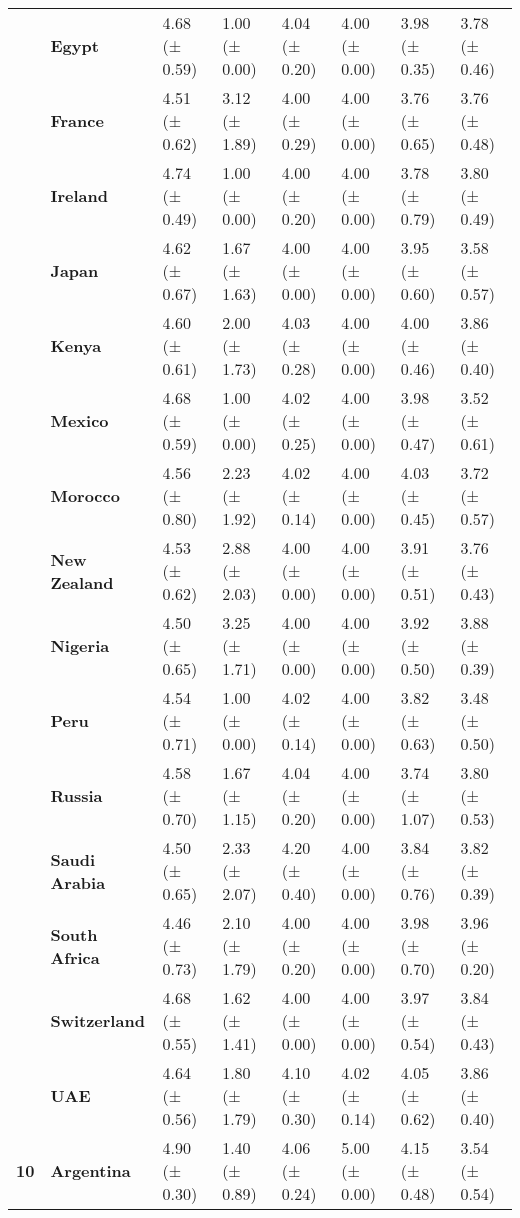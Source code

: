 \begin{longtable}{llllllll}
\textbf{} & \textbf{Egypt} & 4.68 (± 0.59) & 1.00 (± 0.00) & 4.04 (± 0.20) & 4.00 (± 0.00) & 3.98 (± 0.35) & 3.78 (± 0.46) \\
\textbf{} & \textbf{France} & 4.51 (± 0.62) & 3.12 (± 1.89) & 4.00 (± 0.29) & 4.00 (± 0.00) & 3.76 (± 0.65) & 3.76 (± 0.48) \\
\textbf{} & \textbf{Ireland} & 4.74 (± 0.49) & 1.00 (± 0.00) & 4.00 (± 0.20) & 4.00 (± 0.00) & 3.78 (± 0.79) & 3.80 (± 0.49) \\
\textbf{} & \textbf{Japan} & 4.62 (± 0.67) & 1.67 (± 1.63) & 4.00 (± 0.00) & 4.00 (± 0.00) & 3.95 (± 0.60) & 3.58 (± 0.57) \\
\textbf{} & \textbf{Kenya} & 4.60 (± 0.61) & 2.00 (± 1.73) & 4.03 (± 0.28) & 4.00 (± 0.00) & 4.00 (± 0.46) & 3.86 (± 0.40) \\
\textbf{} & \textbf{Mexico} & 4.68 (± 0.59) & 1.00 (± 0.00) & 4.02 (± 0.25) & 4.00 (± 0.00) & 3.98 (± 0.47) & 3.52 (± 0.61) \\
\textbf{} & \textbf{Morocco} & 4.56 (± 0.80) & 2.23 (± 1.92) & 4.02 (± 0.14) & 4.00 (± 0.00) & 4.03 (± 0.45) & 3.72 (± 0.57) \\
\textbf{} & \textbf{New Zealand} & 4.53 (± 0.62) & 2.88 (± 2.03) & 4.00 (± 0.00) & 4.00 (± 0.00) & 3.91 (± 0.51) & 3.76 (± 0.43) \\
\textbf{} & \textbf{Nigeria} & 4.50 (± 0.65) & 3.25 (± 1.71) & 4.00 (± 0.00) & 4.00 (± 0.00) & 3.92 (± 0.50) & 3.88 (± 0.39) \\
\textbf{} & \textbf{Peru} & 4.54 (± 0.71) & 1.00 (± 0.00) & 4.02 (± 0.14) & 4.00 (± 0.00) & 3.82 (± 0.63) & 3.48 (± 0.50) \\
\textbf{} & \textbf{Russia} & 4.58 (± 0.70) & 1.67 (± 1.15) & 4.04 (± 0.20) & 4.00 (± 0.00) & 3.74 (± 1.07) & 3.80 (± 0.53) \\
\textbf{} & \textbf{Saudi Arabia} & 4.50 (± 0.65) & 2.33 (± 2.07) & 4.20 (± 0.40) & 4.00 (± 0.00) & 3.84 (± 0.76) & 3.82 (± 0.39) \\
\textbf{} & \textbf{South Africa} & 4.46 (± 0.73) & 2.10 (± 1.79) & 4.00 (± 0.20) & 4.00 (± 0.00) & 3.98 (± 0.70) & 3.96 (± 0.20) \\
\textbf{} & \textbf{Switzerland} & 4.68 (± 0.55) & 1.62 (± 1.41) & 4.00 (± 0.00) & 4.00 (± 0.00) & 3.97 (± 0.54) & 3.84 (± 0.43) \\
\textbf{} & \textbf{UAE} & 4.64 (± 0.56) & 1.80 (± 1.79) & 4.10 (± 0.30) & 4.02 (± 0.14) & 4.05 (± 0.62) & 3.86 (± 0.40) \\
\cline{1-8}
\multirow[t]{19}{*}{\textbf{10}} & \textbf{Argentina} & 4.90 (± 0.30) & 1.40 (± 0.89) & 4.06 (± 0.24) & 5.00 (± 0.00) & 4.15 (± 0.48) & 3.54 (± 0.54) \\

\end{longtable}
